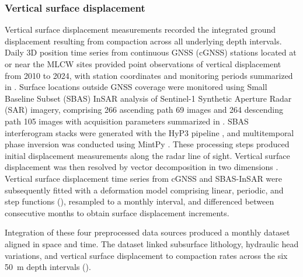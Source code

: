 \subsubsection{Vertical surface displacement}

Vertical surface displacement measurements recorded the integrated ground displacement resulting from compaction across all underlying depth intervals. Daily 3D position time series from continuous GNSS (cGNSS) stations located at or near the MLCW sites \citep{IESAS_TGM_2026} provided point observations of vertical displacement from 2010 to 2024, with station coordinates and monitoring periods summarized in . Surface locations outside GNSS coverage were monitored using Small Baseline Subset (SBAS) InSAR analysis of Sentinel-1 Synthetic Aperture Radar (SAR) imagery, comprising 266 ascending path 69 images and 264 descending path 105 images with acquisition parameters summarized in  \citep{torres_gmes_2012, yague-martinez_interferometric_2016}. SBAS interferogram stacks were generated with the HyP3 pipeline \citep{hogenson_hybrid_2025}, and multitemporal phase inversion was conducted using MintPy \citep{yunjun_small_2019}. These processing steps produced initial displacement measurements along the radar line of sight. Vertical surface displacement was then resolved by vector decomposition in two dimensions \citep{fuhrmann_resolving_2019, hanssen_radar_2001}. Vertical surface displacement time series from cGNSS and SBAS-InSAR were subsequently fitted with a deformation model comprising linear, periodic, and step functions (), resampled to a monthly interval, and differenced between consecutive months to obtain surface displacement increments.

Integration of these four preprocessed data sources produced a monthly dataset aligned in space and time. The dataset linked subsurface lithology, hydraulic head variations, and vertical surface displacement to compaction rates across the six 50~m depth intervals ().


